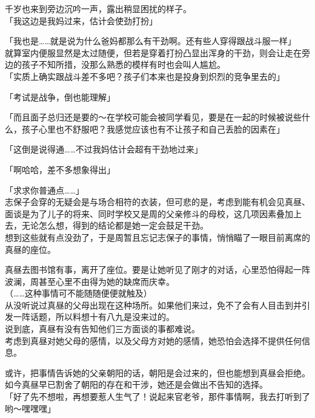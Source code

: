 千岁也来到旁边沉吟一声，露出稍显困扰的样子。\\

「我这边是我妈过来，估计会使劲打扮」

「我也是……就是说为什么爸妈都那么有干劲啊。还有些人穿得跟战斗服一样」\\

就算室内便服显然是太过随便，但若是穿着打扮凸显出浑身的干劲，则会让走在旁边的孩子不知所措，没那么熟悉的模样有时也会叫人尴尬。\\

「实质上确实跟战斗差不多吧？孩子们本来也是投身到炽烈的竞争里去的」

「考试是战争，倒也能理解」

「而且面子总归还是要的～在学校可能会被同学看见，要是在一起的时候被说些什么，孩子心里也不舒服吧？我感觉应该也有不让孩子和自己丢脸的因素在」

「这倒是说得通……不过我妈估计会超有干劲地过来」

「啊哈哈，差不多想象得出」

「求求你普通点……」\\

志保子会穿的无疑会是与场合相符的衣装，但可悲的是，考虑到能有机会见真昼、面谈是为了儿子的将来、同时学校又是周的父亲修斗的母校，这几项因素叠加上去，无论怎么想，得到的结论都是她一定会鼓足干劲。\\

想到这些就有点没劲了，于是周暂且忘记志保子的事情，悄悄瞄了一眼目前离席的真昼的座位。

真昼去图书馆有事，离开了座位。要是让她听见了刚才的对话，心里恐怕得起一阵波澜，周甚至心里不由得为她的缺席而庆幸。\\

（……这种事情可不能随随便便就触及）\\

从没听说过真昼的父母出现在这种场所。如果他们来过，免不了会有人目击到并引发一阵话题，所以料想十有八九是没来过的。\\

说到底，真昼有没有告知他们三方面谈的事都难说。\\

考虑到真昼对她父母的感情，以及父母方对她的感情，她恐怕会选择不提供任何信息。

或许，把事情告诉她的父亲朝阳的话，朝阳是会过来的，但也能想到真昼会拒绝。如今真昼早已割舍了朝阳的存在和干涉，她还是会做出不告知的选择。\\

「好了先不想啦，再想要惹人生气了！说起来官老爷，那件事情啊，我去打听到了哟～嘿嘿嘿」\\

